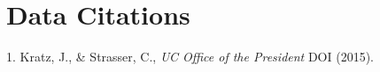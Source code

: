 \documentclass[english]{article}
\begin{document}





\section*{Data Citations}

1. Kratz, J., \& Strasser, C.,  \emph{UC Office of the President} DOI (2015).
\end{document}
